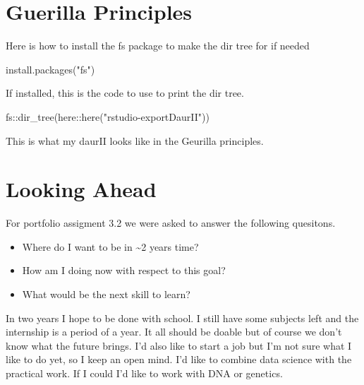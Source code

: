 \documentclass[
]{book}
\newenvironment{Shaded}{\begin{snugshade}}{\end{snugshade}}
\newcommand{\FunctionTok}[1]{\textcolor[rgb]{0.00,0.00,0.00}{#1}}
\newcommand{\NormalTok}[1]{#1}
\newcommand{\SpecialCharTok}[1]{\textcolor[rgb]{0.00,0.00,0.00}{#1}}
\newcommand{\StringTok}[1]{\textcolor[rgb]{0.31,0.60,0.02}{#1}}
\providecommand{\tightlist}{%
  \setlength{\itemsep}{0pt}\setlength{\parskip}{0pt}}
\begin{document}
\hypertarget{guerilla-principles}{%
\chapter{Guerilla Principles}\label{guerilla-principles}}

Here is how to install the fs package to make the dir tree for if needed

\begin{Shaded}
\begin{Highlighting}[]
\FunctionTok{install.packages}\NormalTok{(}\StringTok{"fs"}\NormalTok{)}
\end{Highlighting}
\end{Shaded}

If installed, this is the code to use to print the dir tree.

\begin{Shaded}
\begin{Highlighting}[]
\NormalTok{fs}\SpecialCharTok{::}\FunctionTok{dir\_tree}\NormalTok{(here}\SpecialCharTok{::}\FunctionTok{here}\NormalTok{(}\StringTok{"rstudio{-}exportDaurII"}\NormalTok{))}
\end{Highlighting}
\end{Shaded}

This is what my daurII looks like in the Geurilla principles.

\hypertarget{looking-ahead}{%
\chapter{Looking Ahead}\label{looking-ahead}}

For portfolio assigment 3.2 we were asked to answer the following quesitons.

\begin{itemize}
\tightlist
\item
  Where do I want to be in \textasciitilde2 years time?
\item
  How am I doing now with respect to this goal?
\item
  What would be the next skill to learn?
\end{itemize}

In two years I hope to be done with school. I still have some subjects left and the internship is a period of a year. It all should be doable but of course we don't know what the future brings. I'd also like to start a job but I'm not sure what I like to do yet, so I keep an open mind. I'd like to combine data science with the practical work. If I could I'd like to work with DNA or genetics.
\end{document}
